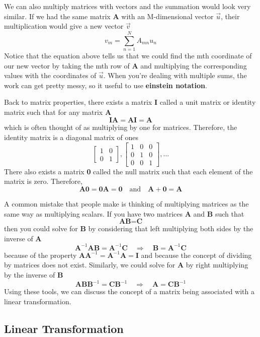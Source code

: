 \documentclass{article}
\newcommand{\be}{\begin{equation}}
\newcommand{\ee}{\end{equation}}
\begin{document}
We can also multiply matrices with vectors and the summation would look very similar.
If we had the same matrix \textbf{A} with an M-dimensional vector $\vec{u}$, their multiplication would give a new vector $\vec{v}$
\be
  v_{m} = \sum_{n=1}^{N} A_{mn} u_{n}
\ee
Notice that the equation above tells us that we could find the mth coordinate of our new vector by taking the mth row of \textbf{A} and multiplying the corresponding values with the coordinates of $\vec{u}$.
When you're dealing with multiple sums, the work can get pretty messy, so it useful to use \textbf{einstein notation}.

Back to matrix properties, there exists a matrix \textbf{I} called a unit matrix or identity matrix such that for any matrix \textbf{A}
\be
  \textbf{I} \textbf{A} = \textbf{A} \textbf{I} = \textbf{A}
\ee
which is often thought of as multiplying by one for matrices.
Therefore, the identity matrix is a diagonal matrix of ones
\be
\begin{bmatrix}
   1 & 0\\
   0 & 1
\end{bmatrix}
,
\begin{bmatrix}
   1 & 0 & 0\\
   0 & 1 & 0\\
   0 & 0 & 1
\end{bmatrix}
, \dots
\ee
There also exists a matrix \textbf{0} called the null matrix such that each element of the matrix is zero.
Therefore,
\be
  \textbf{A} \textbf{0} = \textbf{0} \textbf{A} = \textbf{0} \quad \text{and} \quad \textbf{A} + \textbf{0} = \textbf{A}
\ee

A common mistake that people make is thinking of multiplying matrices as the same way as multiplying scalars.
If you have two matrices \textbf{A} and \textbf{B} such that
\be
  \textbf{A} \textbf{B} = \textbf{C}
\ee
then you could solve for \textbf{B} by considering that left multiplying both sides by the inverse of \textbf{A}
\be
  \textbf{A}^{-1} \textbf{A} \textbf{B} = \textbf{A}^{-1} \textbf{C} \quad \Rightarrow \quad \textbf{B} = \textbf{A}^{-1} \textbf{C}
\ee
because of the property $\textbf{A} \textbf{A}^{-1} = \textbf{A}^{-1} \textbf{A} = \textbf{I}$ and because the concept of dividing by matrices does not exist.
Similarly, we could solve for \textbf{A} by right multiplying by the inverse of \textbf{B}
\be
  \textbf{A} \textbf{B} \textbf{B}^{-1} = \textbf{C} \textbf{B}^{-1} \quad \Rightarrow \quad \textbf{A} = \textbf{C} \textbf{B}^{-1}
\ee
Using these tools, we can discuss the concept of a matrix being associated with a linear transformation.
\subsection*{Linear Transformation}
\end{document}

